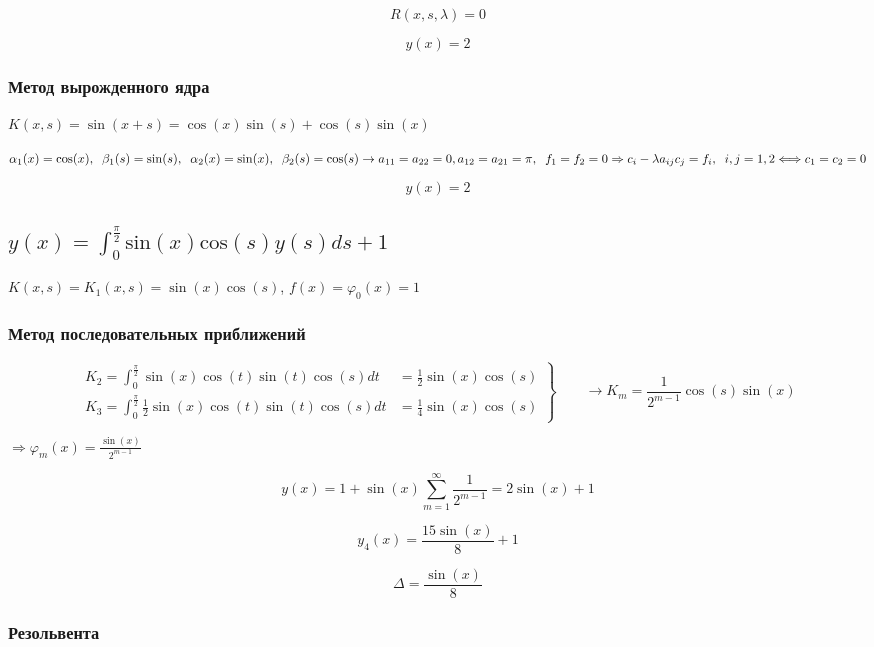 \documentclass[
11pt,
master, %
subf, %
href, %
colorlinks=true, %
times, %
]{disser}
\begin{document}
$$R(x,s,\lambda) = 0$$

$$y(x) = 2$$

\subsubsection{Метод вырожденного ядра}

$\displaystyle K(x,s) = \sin(x+s) = \cos(x) \sin(s) + \cos(s) \sin(x)$

$\displaystyle\alpha_1(x) = \cos(x),\;\;\beta_1(s) = \sin(s),\;\;\alpha_2(x) = \sin(x),\;\;\beta_2(s) = \cos(s)  \rightarrow a_{11} = a_{22} = 0,\\
a_{12} = a_{21} = \pi,\;\; f_1 = f_2 = 0 \Rightarrow c_i - \lambda a_{ij} c_j = f_i,\;\; i,j = 1,2 \Longleftrightarrow c_1 = c_2 = 0$

$$y(x) = 2$$

\subsection{$\displaystyle y(x) = \int_{0}^{\frac{\pi}{2}} \mathrm{sin} (x) \mathrm{cos}(s) y(s)ds + 1$}

$K(x,s) = K_1(x,s) = \sin(x)\cos(s)$, $f(x)= \varphi_0(x) = 1$

\subsubsection{Метод последовательных приближений}

\begin{equation}
 \left.\begin{aligned}
        K_2 = \int_{0}^{\frac{\pi}{2}} \sin(x)\cos(t)\sin(t)\cos(s)dt &= \frac{1}{2} \sin(x) \cos(s)\\
        K_3 = \int_{0}^{\frac{\pi}{2}} \frac{1}{2}\sin(x)\cos(t)\sin(t)\cos(s) dt &= \frac{1}{4} \sin(x)\cos(s)
       \end{aligned}
 \right\}
 \qquad \longrightarrow K_m = \frac{1}{2^{m-1}} \cos(s)\sin(x)
\end{equation}

$\displaystyle\Rightarrow \varphi_m(x) = \frac{\sin(x)}{2^{m-1}}$

\newpage
$$y(x) = 1 + \sin(x)\sum_{m=1}^{\infty}\frac{1}{2^{m-1}} = 2\sin(x) + 1$$

$$y_4(x) = \frac{15 \sin (x)}{8}+1$$

$$\Delta = \frac{\sin(x)}{8}$$

\subsubsection{Резольвента}
\end{document}
